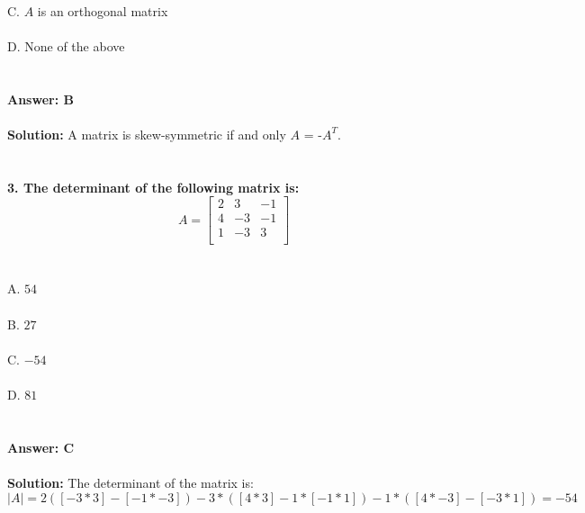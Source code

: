 \documentclass[prl,twocolumn,showpacs,preprintnumbers,superscriptaddress]{revtex4}
\theoremstyle{plain}
\theoremstyle{definition}
\begin{document}
\begin{widetext}
\\
C. $A$ is an orthogonal matrix
\\
\\
D. None of the above
\\
\\
\\
\textbf{Answer: B}
\\
\\
\textbf{Solution:} 
 A matrix is skew-symmetric if and only $A$ = -$A^T$.
\\
\\
\\
\textbf{3. The determinant of the following matrix is:}
\[
A = \begin{bmatrix}    2 & 3 & -1 \\     4 & -3 & -1 \\ 1 & -3 & 3  \\ \end{bmatrix}
\]
\\
\\
A. $54$
\\
\\
B. $27$
\\
\\
C. $-54$
\\
\\
D. $81$
\\
\\
\\
\textbf{Answer: C}
\\
\\
\textbf{Solution:} 
The determinant of the matrix is: $|A| = 2([-3 * 3] - [-1 * -3]) - 3*([4 * 3] - 1 * [-1 * 1]) - 1 * ([4 * -3] - [-3 * 1]) = -54$
\\
\\
\\

\end{widetext}
\end{document}
